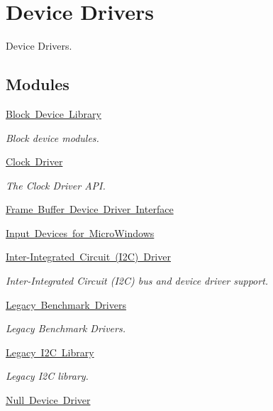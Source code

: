 \hypertarget{group__RTEMSDeviceDrivers}{}\section{Device Drivers}
\label{group__RTEMSDeviceDrivers}


Device Drivers.  


\subsection*{Modules}
\begin{DoxyCompactItemize}
\item 
\mbox{\hyperlink{group__rtems__libblock}{Block Device Library}}
\begin{DoxyCompactList}\small\item\em Block device modules. \end{DoxyCompactList}\item 
\mbox{\hyperlink{group__RTEMSDriverClock}{Clock Driver}}
\begin{DoxyCompactList}\small\item\em The Clock Driver A\+PI. \end{DoxyCompactList}\item 
\mbox{\hyperlink{group__libmisc__fb}{Frame Buffer Device Driver Interface}}
\item 
\mbox{\hyperlink{group__libmisc__fb__mw}{Input Devices for Micro\+Windows}}
\item 
\mbox{\hyperlink{group__I2C}{Inter-\/\+Integrated Circuit (\+I2\+C) Driver}}
\begin{DoxyCompactList}\small\item\em Inter-\/\+Integrated Circuit (I2C) bus and device driver support. \end{DoxyCompactList}\item 
\mbox{\hyperlink{group__RTEMSLegacyBenchmarkDrivers}{Legacy Benchmark Drivers}}
\begin{DoxyCompactList}\small\item\em Legacy Benchmark Drivers. \end{DoxyCompactList}\item 
\mbox{\hyperlink{group__libi2c}{Legacy I2\+C Library}}
\begin{DoxyCompactList}\small\item\em Legacy I2C library. \end{DoxyCompactList}\item 
\mbox{\hyperlink{group__libmisc__devnull}{Null Device Driver}}

\end{DoxyCompactItemize}
